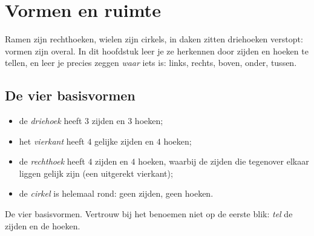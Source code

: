 \chapter{Vormen en ruimte}\label{ch:g1:shapes}

Ramen zijn rechthoeken, wielen zijn cirkels, in daken zitten
driehoeken verstopt: vormen zijn overal. In dit hoofdstuk leer je ze
herkennen door zijden en hoeken te tellen, en leer je precies zeggen
\emph{waar} iets is: links, rechts, boven, onder, tussen.

\section{De vier basisvormen}

\begin{definition}\label{def:g1:shapes:def}
\begin{itemize}
  \item de \emph{driehoek} heeft $3$ zijden en $3$ hoeken;
  \item het \emph{vierkant} heeft $4$ gelijke zijden en $4$ hoeken;
  \item de \emph{rechthoek} heeft $4$ zijden en $4$ hoeken, waarbij de
        zijden die tegenover elkaar liggen gelijk zijn (een uitgerekt
        vierkant);
  \item de \emph{cirkel} is helemaal rond: geen zijden, geen hoeken.
\end{itemize}
\end{definition}

\begin{omfigure}

{\small De vier basisvormen. Vertrouw bij het benoemen niet op de
eerste blik: \emph{tel} de zijden en de hoeken.}
\end{omfigure}

